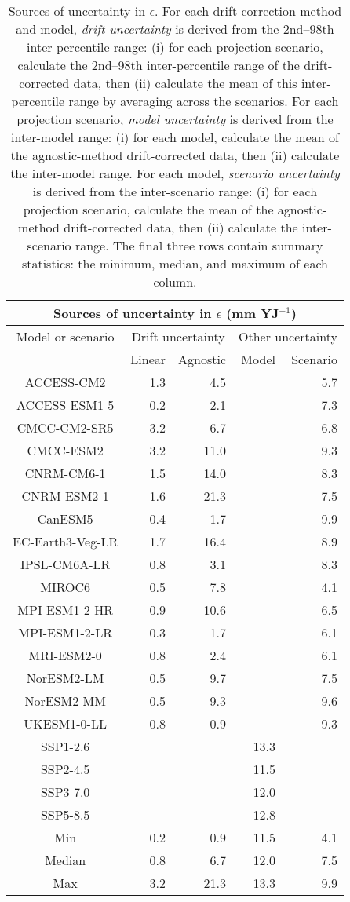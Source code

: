 \begin{table*}[t]
\centering
\caption{Sources of uncertainty in $\epsilon$. For each drift-correction method and model, \emph{drift uncertainty} is derived from the 2nd--98th inter-percentile range: (i) for each projection scenario, calculate the 2nd--98th inter-percentile range of the drift-corrected data, then (ii) calculate the mean of this inter-percentile range by averaging across the scenarios. For each projection scenario, \emph{model uncertainty} is derived from the inter-model range: (i) for each model, calculate the mean of the agnostic-method drift-corrected data, then (ii) calculate the inter-model range. For each model, \emph{scenario uncertainty} is derived from the inter-scenario range: (i) for each projection scenario, calculate the mean of the agnostic-method drift-corrected data, then (ii) calculate the inter-scenario range. The final three rows contain summary statistics: the minimum, median, and maximum of each column.}
\begin{tabular}{c|rr|rr}
\toprule
\multicolumn{5}{c}{Sources of uncertainty in $\epsilon$ (mm YJ$^{-1}$)} \\ 
\midrule
Model or scenario & \multicolumn{2}{c|}{Drift uncertainty} & \multicolumn{2}{c}{Other uncertainty} \\
 & Linear & Agnostic & Model & Scenario \\
\midrule
ACCESS-CM2 & 1.3 & 4.5 &  & 5.7 \\
ACCESS-ESM1-5 & 0.2 & 2.1 &  & 7.3 \\
CMCC-CM2-SR5 & 3.2 & 6.7 &  & 6.8 \\
CMCC-ESM2 & 3.2 & 11.0 &  & 9.3 \\
CNRM-CM6-1 & 1.5 & 14.0 &  & 8.3 \\
CNRM-ESM2-1 & 1.6 & 21.3 &  & 7.5 \\
CanESM5 & 0.4 & 1.7 &  & 9.9 \\
EC-Earth3-Veg-LR & 1.7 & 16.4 &  & 8.9 \\
IPSL-CM6A-LR & 0.8 & 3.1 &  & 8.3 \\
MIROC6 & 0.5 & 7.8 &  & 4.1 \\
MPI-ESM1-2-HR & 0.9 & 10.6 &  & 6.5 \\
MPI-ESM1-2-LR & 0.3 & 1.7 &  & 6.1 \\
MRI-ESM2-0 & 0.8 & 2.4 &  & 6.1 \\
NorESM2-LM & 0.5 & 9.7 &  & 7.5 \\
NorESM2-MM & 0.5 & 9.3 &  & 9.6 \\
UKESM1-0-LL & 0.8 & 0.9 &  & 9.3 \\
SSP1-2.6 &  &  & 13.3 &  \\
SSP2-4.5 &  &  & 11.5 &  \\
SSP3-7.0 &  &  & 12.0 &  \\
SSP5-8.5 &  &  & 12.8 &  \\
\midrule
Min & 0.2 & 0.9 & 11.5 & 4.1 \\
Median & 0.8 & 6.7 & 12.0 & 7.5 \\
Max & 3.2 & 21.3 & 13.3 & 9.9 \\
\bottomrule
\end{tabular}
\end{table*}
